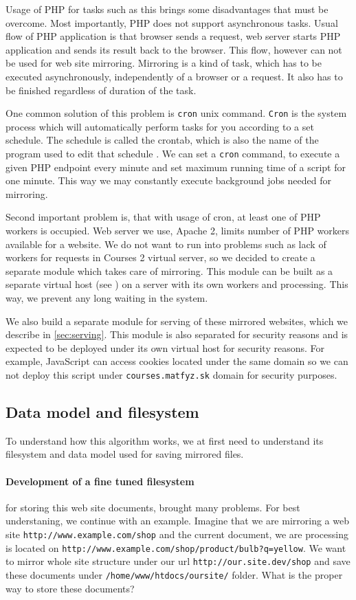 Usage of PHP for tasks such as this brings some disadvantages that must be overcome. Most importantly, PHP does not support asynchronous tasks. Usual flow of PHP application is that browser sends a request, web server starts PHP application and sends its result back to the browser. This flow, however can not be used for web site mirroring. Mirroring is a kind of task, which has to be executed asynchronously, independently of a browser or a request. It also has to be finished regardless of duration of the task.

One common solution of this problem is \texttt{cron} unix command. \texttt{Cron} is the system process which will automatically perform tasks for you according to a set schedule. The schedule is called the crontab, which is also the name of the program used to edit that schedule \cite{crontab}. We can set a \texttt{cron} command, to execute a given PHP endpoint every minute and set maximum running time of a script for one minute. This way we may constantly execute background jobs needed for mirroring.

Second important problem is, that with usage of cron, at least one of PHP workers is occupied. Web server we use, Apache 2, limits number of PHP workers available for a website. We do not want to run into problems such as lack of workers for requests in Courses 2 virtual server, so we decided to create a separate module which takes care of mirroring. This module can be built as a separate virtual host (see \cite{apachepocket}) on a server with its own workers and processing. This way, we prevent any long waiting in the system.

We also build a separate module for serving of these mirrored websites, which we describe in \ref{sec:serving}. This module is also separated for security reasons and is expected to be deployed under its own virtual host for security reasons. For example, JavaScript can access cookies located under the same domain so we can not deploy this script under \texttt{courses.matfyz.sk} domain for security purposes.

\subsection{Data model and filesystem}
\label{sec:filesystem}
To understand how this algorithm works, we at first need to understand its filesystem and data model used for saving mirrored files. 

\paragraph{Development of a fine tuned filesystem} for storing this web site documents, brought many problems. For best understaning, we continue with an example. Imagine that we are mirroring a web site \texttt{http://www.example.com/shop} and the current document, we are processing is located on \texttt{http://www.example.com/shop/product/bulb?q=yellow}. We want to mirror whole site structure under our url \texttt{http://our.site.dev/shop} and save these documents under \texttt{/home/www/htdocs/oursite/} folder. What is the proper way to store these documents?

